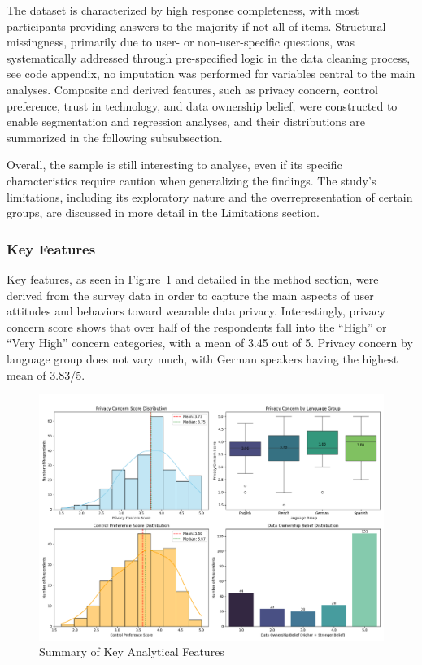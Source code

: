 	The dataset is characterized by high response completeness, with most participants providing answers to the majority if not all of items. Structural missingness, primarily due to user- or non-user-specific questions, was systematically addressed through pre-specified logic in the data cleaning process, see code appendix, no imputation was performed for variables central to the main analyses. Composite and derived features, such as privacy concern, control preference, trust in technology, and data ownership belief, were constructed to enable segmentation and regression analyses, and their distributions are summarized in the following subsubsection.
	
	Overall, the sample is still interesting to analyse, even if its specific characteristics require caution when generalizing the findings. The study's limitations, including its exploratory nature and the overrepresentation of certain groups, are discussed in more detail in the Limitations section.
	\subsubsection{Key Features}
	Key features, as seen in Figure~\ref{fig:derived_features_summary} and detailed in the method section, were derived from the survey data in order to capture the main aspects of user attitudes and behaviors toward wearable data privacy. Interestingly, privacy concern score shows that over half of the respondents fall into the “High” or “Very High” concern categories, with a mean of 3.45 out of 5. Privacy concern by language group does not vary much, with German speakers having the highest mean of 3.83/5.
	\begin{figure}[h!]
        \centering %
		\includegraphics[width=\linewidth]{figures/img/derived_features_summary.png}
		\caption{Summary of Key Analytical Features}
		\label{fig:derived_features_summary}
	\end{figure}
	

